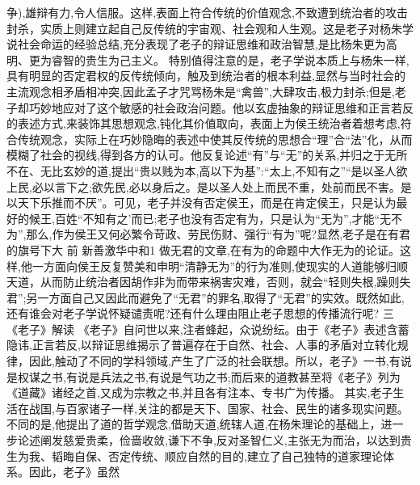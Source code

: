 \documentclass[a4paper,12pt,UTF8,twoside]{ctexbook}
\begin{document}
争),雄辩有力,令人信服。这样,表面上符合传统的价值观念,不致遭到统治者的攻击封杀，实质上则建立起自己反传统的宇宙观、社会观和人生观。这是老子对杨朱学说社会命运的经验总结,充分表现了老子的辩证思维和政治智慧,是比杨朱更为高明、更为睿智的贵生为己主义。
特别值得注意的是，老子学说本质上与杨朱一样,具有明显的否定君权的反传统倾向，触及到统治者的根本利益,显然与当时社会的主流观念相矛盾相冲突,因此孟子才咒骂杨朱是“禽兽”,大肆攻击,极力封杀;但是,老子却巧妙地应对了这个敏感的社会政治问题。他以玄虚抽象的辩证思维和正言若反的表述方式,来装饰其思想观念,钝化其价值取向，表面上为侯王统治者着想考虑,符合传统观念，实际上在巧妙隐晦的表述中使其反传统的思想合“理”合“法”化，从而模糊了社会的视线,得到各方的认可。他反复论述“有”与“无”的关系,并归之于无所不在、无比玄妙的道,提出“贵以贱为本,高以下为基”:“太上,不知有之”“是以圣人欲上民,必以言下之;欲先民,必以身后之。是以圣人处上而民不重，处前而民不害。是以天下乐推而不厌”。可见，老子并没有否定侯王，而是在肯定侯王，只是认为最好的候王,百姓“不知有之’而已;老子也没有否定有为，只是认为“无为”,才能“无不为”,那么,作为侯王又何必繁令苛政、劳民伤财、强行“有为”呢?显然,老子是在有君的旗号下大
前
新善激华中和1
做无君的文章,在有为的命题中大作无为的论证。这样,他一方面向侯王反复赞美和申明“清静无为”的行为准则,使现实的人道能够归顺天道，从而防止统治者因胡作非为而带来祸害灾难，否则，就会“轻则失根,躁则失君”;另一方面自己又因此而避免了“无君”的罪名,取得了“无君”的实效。既然如此,还有谁会对老子学说怀疑谴责呢?还有什么理由阻止老子思想的传播流行呢?
三《老子》解读
《老子》自问世以来,注者蜂起，众说纷纭。由于《老子》表述含蓄隐讳,正言若反,以辩证思维揭示了普遍存在于自然、社会、人事的矛盾对立转化规律，因此,触动了不同的学科领域,产生了广泛的社会联想。所以，老子》一书,有说是权谋之书,有说是兵法之书,有说是气功之书;而后来的道教甚至将《老子》列为《道藏》诸经之首,又成为宗教之书,并且各有注本、专书广为传播。
其实,老子生活在战国,与百家诸子一样,关注的都是天下、国家、社会、民生的诸多现实问题。不同的是,他提出了道的哲学观念,借助天道,统辖人道,在杨朱理论的基础上，进一步论述阐发慈爱贵柔，俭啬收敛,谦下不争,反对圣智仁义,主张无为而治，以达到贵生为我、韬晦自保、否定传统、顺应自然的目的,建立了自己独特的道家理论体系。因此，老子》虽然
\end{document}
